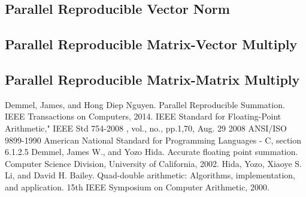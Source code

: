 \documentclass[12pt]{article}
\theoremstyle{plain}
\begin{document}
  \subsection{Parallel Reproducible Vector Norm}
  \subsection{Parallel Reproducible Matrix-Vector Multiply}
  \subsection{Parallel Reproducible Matrix-Matrix Multiply}
\begin{thebibliography}{9}
    Demmel, James, and Hong Diep Nguyen. Parallel Reproducible Summation. IEEE Transactions on Computers, 2014.
    IEEE Standard for Floating-Point Arithmetic," IEEE Std 754-2008 , vol., no., pp.1,70, Aug. 29 2008
    ANSI/ISO 9899-1990 American National Standard for Programming Languages - C, section 6.1.2.5
    Demmel, James W., and Yozo Hida. Accurate floating point summation. Computer Science Division, University of California, 2002.
    Hida, Yozo, Xiaoye S. Li, and David H. Bailey. Quad-double arithmetic: Algorithms, implementation, and application. 15th IEEE Symposium on Computer Arithmetic, 2000.
\end{thebibliography}
\end{document}
